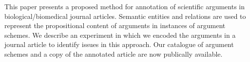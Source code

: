 This paper presents a proposed method for annotation of scientific arguments in biological/biomedical journal articles. Semantic entities and relations are used to represent the propositional content of arguments in instances of argument schemes.  We describe an experiment in which we encoded the arguments in a journal article to identify issues in this approach. Our catalogue of argument schemes and a copy of the annotated article are now publically available.
